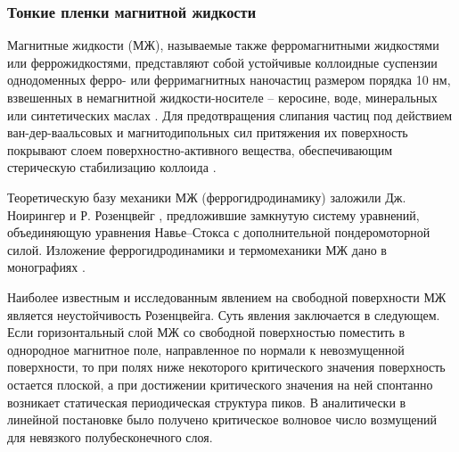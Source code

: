 \documentclass[12pt,a4paper]{article}
\begin{document}





\subsubsection{Тонкие пленки магнитной жидкости}

Магнитные жидкости (МЖ), называемые также ферромагнитными жидкостями или феррожидкостями, представляют собой устойчивые коллоидные суспензии однодоменных ферро- или ферримагнитных наночастиц размером порядка 10 нм, взвешенных в немагнитной жидкости-носителе -- керосине, воде, минеральных или синтетических маслах \cite{Cowley1989, Shliomis1974}. Для предотвращения слипания частиц под действием ван-дер-ваальсовых и магнитодипольных сил притяжения их поверхность покрывают слоем поверхностно-активного вещества, обеспечивающим стерическую стабилизацию коллоида \cite{Blum1989}.

Теоретическую базу механики МЖ (феррогидродинамику) заложили Дж. Ноирингер и Р. Розенцвейг \cite{Neuringer1964}, предложившие замкнутую систему уравнений, объединяющую уравнения Навье--Стокса с дополнительной пондеромоторной силой. Изложение феррогидродинамики и термомеханики МЖ дано в монографиях \cite{Cowley1989, Berkovskiy1989, Bashtovoy1989, Blum1989}. 

Наиболее известным и исследованным явлением на свободной поверхности МЖ является неустойчивость Розенцвейга. Суть явления заключается в следующем. Если горизонтальный слой МЖ со свободной поверхностью поместить в однородное магнитное поле, направленное по нормали к невозмущенной поверхности, то при полях ниже некоторого критического значения поверхность остается плоской, а при достижении критического значения на ней спонтанно возникает статическая периодическая структура пиков. В \cite{Cowley1967} аналитически в линейной постановке было получено критическое волновое число возмущений для невязкого полубесконечного слоя. 
\end{document}
